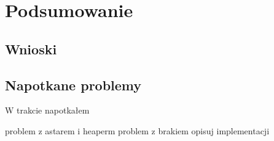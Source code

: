 \chapter{Podsumowanie}
\label{cha:podsumowanie}

\section{Wnioski}
\section{Napotkane problemy}

W trakcie napotkałem

problem z astarem i heaperm
problem z brakiem opisuj implementacji